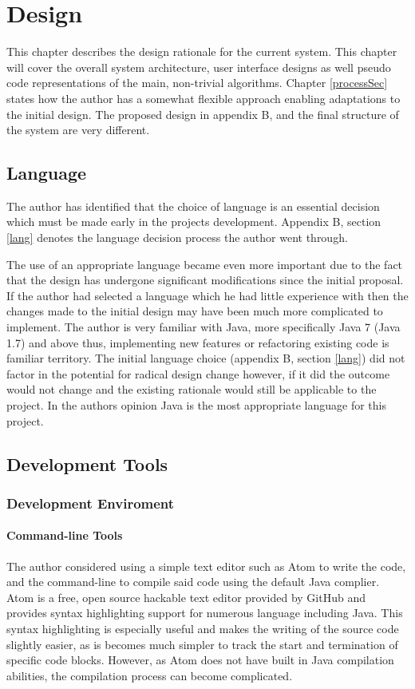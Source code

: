 \chapter{Design}
\label{DesignSec}
This chapter describes the design rationale for the current system. This chapter will cover the overall system architecture, user interface designs as well pseudo code representations of the main, non-trivial algorithms. Chapter \ref{processSec} states how the author has a somewhat flexible approach enabling adaptations to the initial design. The proposed design in appendix B, and the final structure of the system are very different.

\section{Language}

The author has identified that the choice of language is an essential decision which must be made early in the projects development. Appendix B, section \ref{lang} denotes the language decision process the author went through.

The use of an appropriate language became even more important due to the fact that the design has undergone significant modifications since the initial proposal. If the author had selected a language which he had little experience with then the changes made to the initial design may have been much more complicated to implement. The author is very familiar with Java, more specifically Java 7 (Java 1.7) and above thus, implementing new features or refactoring existing code is familiar territory. The initial language choice (appendix B, section \ref{lang}) did not factor in the potential for radical design change however, if it did the outcome would not change and the existing rationale would still be applicable to the project. In the authors opinion Java is the most appropriate language for this project.

\section{Development Tools}
\subsection{Development Enviroment}

\subsubsection{Command-line Tools}
\label{sseccmd}
The author considered using a simple text editor such as Atom\cite{atom:textEditor} to write the code, and the command-line to compile said code using the default Java complier. Atom is a free, open source hackable text editor provided by GitHub and provides syntax highlighting support for numerous language including Java. This syntax highlighting is especially useful and makes the writing of the source code slightly easier, as is becomes much simpler to track the start and termination of specific code blocks. However, as Atom does not have built in Java compilation abilities, the compilation process can become complicated.

